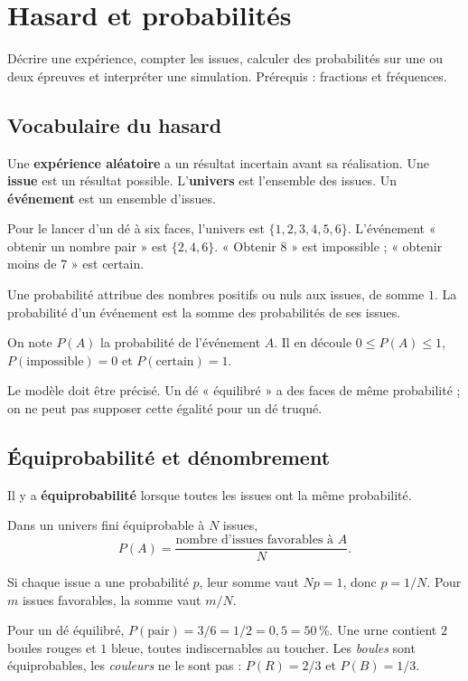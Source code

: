 \documentclass[../cours_3e.tex]{subfiles}
\begin{document}
\setcounter{chapter}{10}
\chapter{Hasard et probabilités}
\label{ch:probabilites}
\begin{objectif}
Décrire une expérience, compter les issues, calculer des probabilités sur une ou deux épreuves et interpréter une simulation. Prérequis : fractions et fréquences.
\end{objectif}
\section{Vocabulaire du hasard}
\begin{definition}
Une \textbf{expérience aléatoire} a un résultat incertain avant sa réalisation. Une \textbf{issue} est un résultat possible. L'\textbf{univers} est l'ensemble des issues. Un \textbf{événement} est un ensemble d'issues.
\end{definition}
Pour le lancer d'un dé à six faces, l'univers est $\{1,2,3,4,5,6\}$. L'événement « obtenir un nombre pair » est $\{2,4,6\}$. « Obtenir $8$ » est impossible ; « obtenir moins de $7$ » est certain.
\begin{definition}
Une probabilité attribue des nombres positifs ou nuls aux issues, de somme $1$. La probabilité d'un événement est la somme des probabilités de ses issues.
\end{definition}
On note $P(A)$ la probabilité de l'événement $A$. Il en découle $0\leq P(A)\leq1$, $P(\text{impossible})=0$ et $P(\text{certain})=1$.
\begin{attention}
Le modèle doit être précisé. Un dé « équilibré » a des faces de même probabilité ; on ne peut pas supposer cette égalité pour un dé truqué.
\end{attention}
\section{Équiprobabilité et dénombrement}
\begin{definition}
Il y a \textbf{équiprobabilité} lorsque toutes les issues ont la même probabilité.
\end{definition}
\begin{propriete}
Dans un univers fini équiprobable à $N$ issues,
\[P(A)=\frac{\text{nombre d'issues favorables à }A}{N}.\]
\end{propriete}
\begin{demonstration}
Si chaque issue a une probabilité $p$, leur somme vaut $Np=1$, donc $p=1/N$. Pour $m$ issues favorables, la somme vaut $m/N$.
\end{demonstration}
Pour un dé équilibré, $P(\text{pair})=3/6=1/2=0{,}5=50\,\%$.
Une urne contient $2$ boules rouges et $1$ bleue, toutes indiscernables au toucher. Les \emph{boules} sont équiprobables, les \emph{couleurs} ne le sont pas : $P(R)=2/3$ et $P(B)=1/3$.
\end{document}
